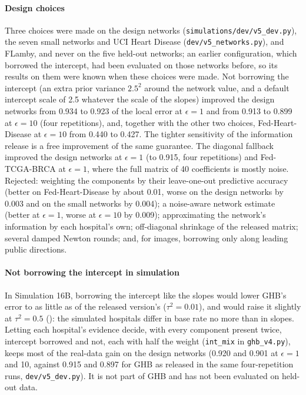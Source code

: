 \documentclass[acmsmall,screen,nonacm]{acmart}
\theoremstyle{acmdefinition}
\begin{document}
\paragraph{Design choices} Three choices were made on the design networks (\texttt{simulations/dev/v5\_dev.py}), the seven small networks and UCI Heart Disease (\texttt{dev/v5\_networks.py}), and FLamby, and never on the five held-out networks; an earlier configuration, which borrowed the intercept, had been evaluated on those networks before, so its results on them were known when these choices were made. Not borrowing the intercept (an extra prior variance $2.5^2$ around the network value, and a default intercept scale of 2.5 whatever the scale of the slopes) improved the design networks from 0.934 to 0.923 of the local error at $\epsilon=1$ and from 0.913 to 0.899 at $\epsilon=10$ (four repetitions), and, together with the other two choices, Fed-Heart-Disease at $\epsilon=10$ from 0.440 to 0.427. The tighter sensitivity of the information release is a free improvement of the same guarantee. The diagonal fallback improved the design networks at $\epsilon=1$ (to 0.915, four repetitions) and Fed-TCGA-BRCA at $\epsilon=1$, where the full matrix of 40 coefficients is mostly noise. Rejected: weighting the components by their leave-one-out predictive accuracy (better on Fed-Heart-Disease by about 0.01, worse on the design networks by 0.003 and on the small networks by 0.004); a noise-aware network estimate (better at $\epsilon=1$, worse at $\epsilon=10$ by 0.009); approximating the network's information by each hospital's own; off-diagonal shrinkage of the released matrix; several damped Newton rounds; and, for images, borrowing only along leading public directions.

\paragraph{Not borrowing the intercept in simulation} In Simulation 16B, borrowing the intercept like the slopes would lower GHB's error to as little as \SimSixteenBIntMin{} of the released version's ($\tau^2=0.01$), and would raise it slightly at $\tau^2=0.5$ (\SimSixteenBIntMax): the simulated hospitals differ in base rate no more than in slopes. Letting each hospital's evidence decide, with every component present twice, intercept borrowed and not, each with half the weight (\texttt{int\_mix} in \texttt{ghb\_v4.py}), keeps most of the real-data gain on the design networks (0.920 and 0.901 at $\epsilon=1$ and 10, against 0.915 and 0.897 for GHB as released in the same four-repetition runs, \texttt{dev/v5\_dev.py}). It is not part of GHB and has not been evaluated on held-out data.
\end{document}
